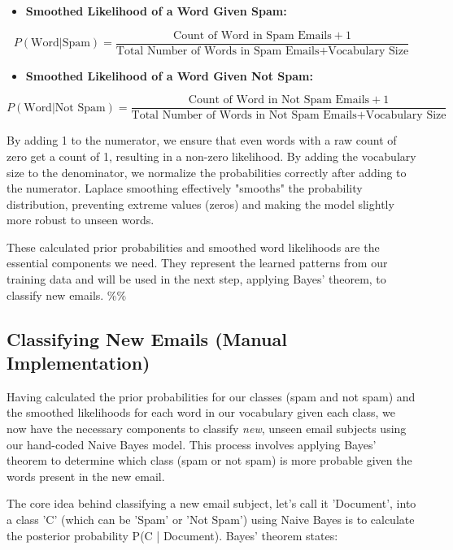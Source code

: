 \documentclass[12pt,a4paper]{article}
\begin{document}
\begin{itemize}
    \item \textbf{Smoothed Likelihood of a Word Given Spam:}
\end{itemize}

\[P(\text{Word} | \text{Spam}) = \frac{\text{Count of Word in Spam Emails} + 1}{\text{Total Number of Words in Spam Emails} + \text{Vocabulary Size}}\]

\begin{itemize}
    \item \textbf{Smoothed Likelihood of a Word Given Not Spam:}
\end{itemize}

\[P(\text{Word} | \text{Not Spam}) = \frac{\text{Count of Word in Not Spam Emails} + 1}{\text{Total Number of Words in Not Spam Emails} + \text{Vocabulary Size}}\]

By adding 1 to the numerator, we ensure that even words with a raw count of zero get a count of 1, resulting in a non-zero likelihood. By adding the vocabulary size to the denominator, we normalize the probabilities correctly after adding to the numerator. Laplace smoothing effectively "smooths" the probability distribution, preventing extreme values (zeros) and making the model slightly more robust to unseen words.

These calculated prior probabilities and smoothed word likelihoods are the essential components we need. They represent the learned patterns from our training data and will be used in the next step, applying Bayes' theorem, to classify new emails.
\%\%


\subsection{Classifying New Emails (Manual Implementation)}

Having calculated the prior probabilities for our classes (spam and not spam) and the smoothed likelihoods for each word in our vocabulary given each class, we now have the necessary components to classify \textit{new}, unseen email subjects using our hand-coded Naive Bayes model. This process involves applying Bayes' theorem to determine which class (spam or not spam) is more probable given the words present in the new email.

The core idea behind classifying a new email subject, let's call it 'Document', into a class 'C' (which can be 'Spam' or 'Not Spam') using Naive Bayes is to calculate the posterior probability P(C | Document). Bayes' theorem states:
\end{document}

